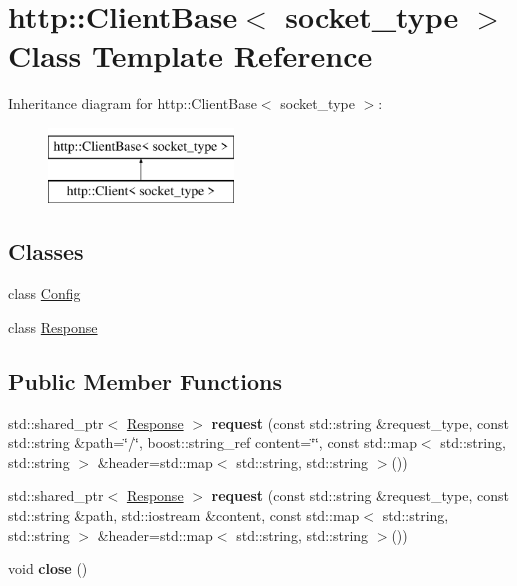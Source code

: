 \hypertarget{classhttp_1_1_client_base}{}\section{http\+:\+:Client\+Base$<$ socket\+\_\+type $>$ Class Template Reference}
\label{classhttp_1_1_client_base}
Inheritance diagram for http\+:\+:Client\+Base$<$ socket\+\_\+type $>$\+:\begin{figure}[H]
\begin{center}
\leavevmode
\includegraphics[height=2.000000cm]{d2/d7e/classhttp_1_1_client_base}
\end{center}
\end{figure}
\subsection*{Classes}
\begin{DoxyCompactItemize}
\item 
class \hyperlink{classhttp_1_1_client_base_1_1_config}{Config}
\item 
class \hyperlink{classhttp_1_1_client_base_1_1_response}{Response}
\end{DoxyCompactItemize}
\subsection*{Public Member Functions}
\begin{DoxyCompactItemize}
\item 
\mbox{\label{classhttp_1_1_client_base_a3e625144c683838d9731b071d25570c2}} 
std\+::shared\+\_\+ptr$<$ \hyperlink{classhttp_1_1_client_base_1_1_response}{Response} $>$ {\bfseries request} (const std\+::string \&request\+\_\+type, const std\+::string \&path=\char`\"{}/\char`\"{}, boost\+::string\+\_\+ref content=\char`\"{}\char`\"{}, const std\+::map$<$ std\+::string, std\+::string $>$ \&header=std\+::map$<$ std\+::string, std\+::string $>$())
\item 
\mbox{\label{classhttp_1_1_client_base_a73afa2fcfa3f9991dcf3590e503de569}} 
std\+::shared\+\_\+ptr$<$ \hyperlink{classhttp_1_1_client_base_1_1_response}{Response} $>$ {\bfseries request} (const std\+::string \&request\+\_\+type, const std\+::string \&path, std\+::iostream \&content, const std\+::map$<$ std\+::string, std\+::string $>$ \&header=std\+::map$<$ std\+::string, std\+::string $>$())
\item 
\mbox{\label{classhttp_1_1_client_base_a98810f3e43a414012a07862384cb095f}} 
void {\bfseries close} ()
\end{DoxyCompactItemize}
